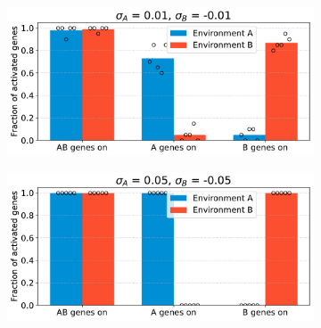 \begin{figure}[H]
  \begin{subfigure}[t]{0.49\textwidth}
    \includegraphics[width=\textwidth]{alife/img/mean_activation_sigma-0.01.pdf}
    \label{subfig:alife:param_sigma_1}
  \end{subfigure}
  \begin{subfigure}[t]{0.49\textwidth}
    \includegraphics[width=\textwidth]{alife/img/mean_activation_sigma-0.05.pdf}
    \label{subfig:alife:param_sigma_2}
  \end{subfigure}


\end{figure}
